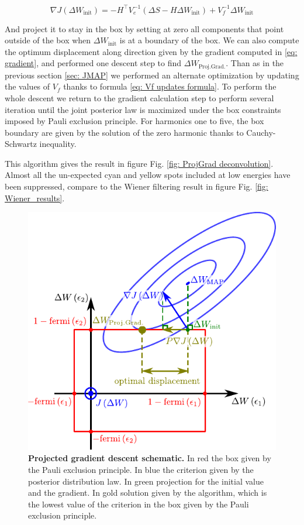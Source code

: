 \begin{equation}
\nabla J\left(\Delta W_{\mathrm{init}}\right) = -H^{\top}V^{-1}_{e}\left(\Delta S-H\Delta W_{\mathrm{init}}\right)+V^{-1}_{f}\Delta W_{\mathrm{init}} \label{eq: gradient}
\end{equation}

And project it to stay in the box by setting at zero all components that point outside of the box when $\Delta W_{\mathrm{init}}$ is at a boundary of the box. We can also compute the optimum displacement along direction given by the gradient computed in \eqref{eq: gradient}, and performed one descent step to find $\Delta W_{\mathrm{Proj.Grad.}}$. Than as in the previous section \ref{sec: JMAP} we performed an alternate optimization by updating the values of $V_{f}$ thanks to formula \eqref{eq: Vf updates formula}. To perform the whole descent we return to the gradient calculation step to perform several iteration until the joint posterior law is maximized under the box constraints imposed by Pauli exclusion principle. For harmonics one to five, the box boundary are given by the solution of the zero harmonic thanks to Cauchy-Schwartz inequality.

This algorithm gives the result in figure Fig. \ref{fig: ProjGrad deconvolution}. Almost all the un-expected cyan and yellow spots included at low energies have been suppressed, compare to the Wiener filtering result in figure Fig. \ref{fig: Wiener_results}.


\begin{figure}[hptb]
	\centering
	\includegraphics[width = 10 cm]{./appA/gradient_descent_schematics}
	\caption{\textbf{Projected gradient descent schematic.} In red the box given by the Pauli exclusion principle. In blue the criterion given by the posterior distribution law. In green projection for the initial value and the gradient. In gold solution given by the algorithm, which is the lowest value of the criterion in the box given by the Pauli exclusion principle.}
	\label{fig: ProjGrad descent}
\end{figure}

